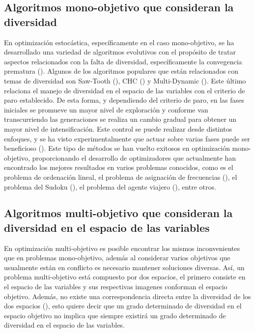 \subsection{Algoritmos mono-objetivo que consideran la diversidad}
En optimización estocástica, específicamente en el caso mono-objetivo, se ha desarrollado una variedad de algoritmos evolutivos con el propósito de tratar aspectos relacionados con la falta de diversidad, específicamente la convegencia prematura (\cite{Joel:Crepinsek}).
%
Algunos de los algoritmos populares que están relacionados con temas de diversidad son Saw-Tooth (\cite{Joel:SAWTOOTH}), CHC (\cite{Joel:CHC}) y Multi-Dynamic (\cite{Joel:MULTI_DYNAMIC}).
%
Este último relaciona el manejo de diversidad en el espacio de las variables con el criterio de paro establecido. %
%
De esta forma, y dependiendo del criterio de paro, en las fases iniciales se promueve un mayor nivel de exploración y conforme van transcurriendo las generaciones se realiza un cambio gradual para obtener un mayor nivel de intensificación.
%
Este control se puede realizar desde distintos enfoques, y se ha visto experimentalmente que actuar sobre varias fases puede ser beneficioso (\cite{Joel:ANovelDiversityBasedEAForTheTSP}).
%
Este tipo de métodos se han vuelto exitosos en optimización mono-objetivo, proporcionando el desarrollo de optimizadores que actualmente han encontrado los mejores resultados en varios problemas conocidos, como es el problema de ordenación lineal, el problema de asignación de frecuencias  (\cite{Joel:Dynamic_FAP}), el problema del Sudoku  (\cite{Joel:Dynamic_Sudoku}), el problema del agente viajero  (\cite{Joel:ANovelDiversityBasedEAForTheTSP}), entre otros.

\subsection{Algoritmos multi-objetivo que consideran la diversidad en el espacio de las variables}

%
En optimización multi-objetivo es posible encontrar los mismos inconvenientes que en problemas mono-objetivo, además al considerar varios objetivos que usualmente están en conflicto es necesario mantener soluciones diversas.
%
Así, un problema multi-objetivo está compuesto por dos espacios, el primero consiste en el espacio de las variables y sus respectivas imagenes conforman el espacio objetivo.
%
Además, no existe una correspondencia directa entre la diversidad de los dos espacios (\cite{shir2009enhancing}), esto quiere decir que un grado determinado de diversidad en el espacio objetivo no implica que siempre existirá un grado determinado de diversidad en el espacio de las variables.

